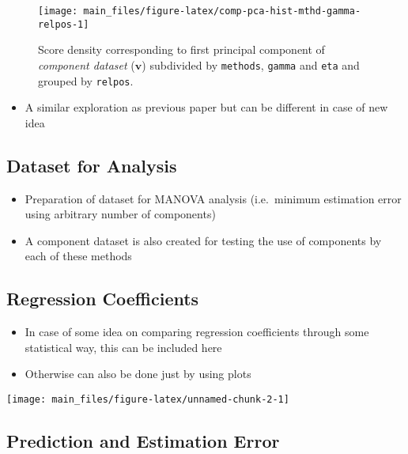 \documentclass[12pt,3p,authoryear]{elsarticle}
\providecommand{\tightlist}{%
  \setlength{\itemsep}{0pt}\setlength{\parskip}{0pt}}
\begin{document}
\begin{figure}[!htb]
\texttt{[image: main\_files/figure-latex/comp-pca-hist-mthd-gamma-relpos-1]} \caption{Score density corresponding to first principal component
of \emph{component dataset} (\(\mathbf{v}\)) subdivided by
\texttt{methods}, \texttt{gamma} and \texttt{eta} and grouped by
\texttt{relpos}.}\label{fig:comp-pca-hist-mthd-gamma-relpos}
\end{figure}

\begin{itemize}
\tightlist
\item
  A similar exploration as previous paper but can be different in case
  of new idea
\end{itemize}

\subsection{Dataset for Analysis}\label{dataset-for-analysis}

\begin{itemize}
\tightlist
\item
  Preparation of dataset for MANOVA analysis (i.e.~minimum estimation
  error using arbitrary number of components)
\item
  A component dataset is also created for testing the use of components
  by each of these methods
\end{itemize}

\subsection{Regression Coefficients}\label{regression-coefficients}

\begin{itemize}
\tightlist
\item
  In case of some idea on comparing regression coefficients through some
  statistical way, this can be included here
\item
  Otherwise can also be done just by using plots
\end{itemize}

\texttt{[image: main\_files/figure-latex/unnamed-chunk-2-1]}

\subsection{Prediction and Estimation
Error}\label{prediction-and-estimation-error}
\end{document}
